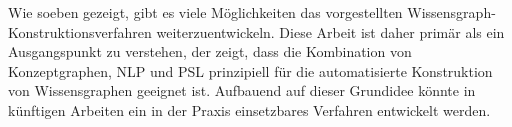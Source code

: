 Wie soeben gezeigt, gibt es viele Möglichkeiten das vorgestellten Wissensgraph-Konstruktionsverfahren weiterzuentwickeln.
Diese Arbeit ist daher primär als ein Ausgangspunkt zu verstehen, der zeigt, dass die Kombination von Konzeptgraphen, NLP und PSL prinzipiell für die automatisierte Konstruktion von Wissensgraphen geeignet ist.
Aufbauend auf dieser Grundidee könnte in künftigen Arbeiten ein in der Praxis einsetzbares Verfahren entwickelt werden.
